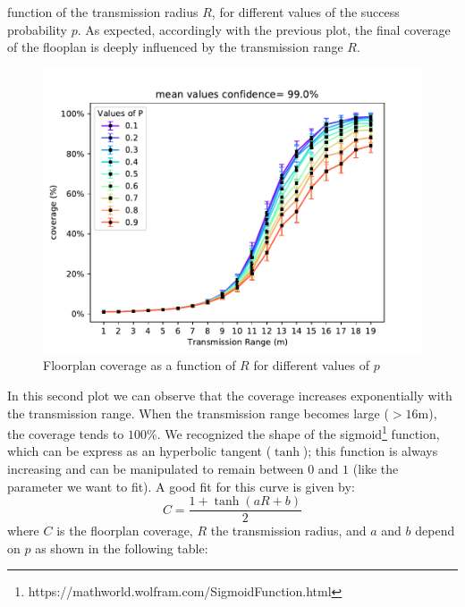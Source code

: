 function of the transmission radius $R$, for different values of the success probability $p$. As expected, accordingly with the previous plot, the
final coverage of the flooplan is deeply influenced by the transmission range $R$.
\begin{figure}[H]
    \begin{center}
        \includegraphics[scale=.75]{img/Big_CovRange_mean.pdf}
    \end{center}
    \vspace*{-0.5cm}
    \caption{Floorplan coverage as a function of $R$ for different values of $p$}
    \label{fig:floorplancoverage2}
\end{figure}
\noindent
In this second plot we can observe that the coverage increases exponentially
with the transmission range. When the transmission range becomes large
($> 16$m), the coverage tends to $100$\%. We recognized the shape of the
sigmoid\footnote{https://mathworld.wolfram.com/SigmoidFunction.html} function,
which can be express as an hyperbolic tangent ($\tanh$); this function is always
increasing and can be manipulated to remain between $0$ and $1$ (like the
parameter we want to fit). A good fit for this curve is given by:
\begin{equation*}
    C = \frac{1+\tanh(aR+b)}{2}
\end{equation*}
where $C$ is the floorplan coverage, $R$ the transmission radius, and $a$ and
$b$ depend on $p$ as shown in the following table:
